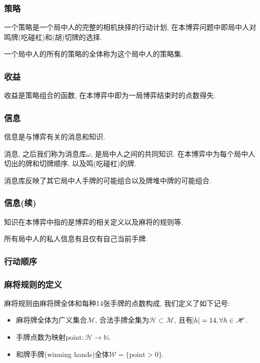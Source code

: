 \documentclass[xcolor=dvipsnames]{ctexbeamer}
\renewenvironment{note}[1][\empty]
    {\block{注(#1)}}
    {\endblock}
\newcommand{\mahjong}{\mathscr{M}}
\newcommand{\point}{\mathrm{point}}
\newcommand{\Hand}{\mathscr{H}}
\newcommand{\hand}{h}
\newcommand{\base}{\omega}
\begin{document}
	\begin{frame}
		\frametitle{策略}
		\begin{definition}[策略]
			一个策略是一个局中人的完整的相机抉择的行动计划,
			在本博弈问题中即局中人对鸣牌(吃碰杠)和(胡)切牌的选择.
		\end{definition}
		\begin{definition}[策略集]
			一个局中人的所有的策略的全体称为这个局中人的策略集.
		\end{definition}
	\end{frame}

	\begin{frame}
		\frametitle{收益}
		\begin{definition}[收益]
			收益是策略组合的函数, 在本博弈中即为一局博弈结束时的点数得失.
		\end{definition}
	\end{frame}

	\begin{frame}
		\frametitle{信息}
		\begin{definition}[信息]
			信息是与博弈有关的消息和知识.
		\end{definition}
		\begin{definition}[消息]
			消息, 之后我们称为消息库$\base$, 是局中人之间的共同知识.
			在本博弈中为每个局中人切出的牌和切牌顺序, 以及鸣(吃碰杠)的牌.
		\end{definition}
		\begin{note}[消息库]
			消息库反映了其它局中人手牌的可能组合以及牌堆中牌的可能组合.
		\end{note}
	\end{frame}

	\begin{frame}
		\frametitle{信息(续)}
		\begin{definition}[知识]
			知识在本博弈中指的是博弈的相关定义以及麻将的规则等.
		\end{definition}
		\begin{note}[私人信息]
			所有局中人的私人信息有且仅有自己当前手牌.
		\end{note}
	\end{frame}
	
	\begin{frame}
		\frametitle{行动顺序}

	\end{frame}

	\begin{frame}
		\frametitle{麻将规则的定义}
		\begin{definition}[麻将规则]
			麻将规则由麻将牌全体和每种14张手牌的点数构成, 我们定义了如下记号:
			\begin{itemize}
				\item 麻将牌全体为广义集合$\mahjong$,
					合法手牌全集为$\Hand\subset\mahjong$,
					且有$\abs{\hand}=14, \forall{\hand\in\Hand}$.
				\item 手牌点数为映射$\point: \Hand\rightarrow\mathbb{N}$.
				\item 和牌手牌(winning hands)全体$\mathscr{W}=\{\point>0\}$.
			\end{itemize}
		\end{definition}
	\end{frame}
\end{document}
